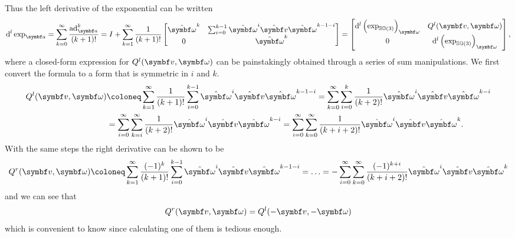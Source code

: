 Thus the left derivative of the exponential can be written
\begin{equation*}
  \mathrm{d}^l \exp_\a = \sum_{k = 0}^\infty \frac{\ad_\a^k}{(k+1)!} = I + \sum_{k = 1}^\infty \frac{1}{(k+1)!}  \begin{bmatrix}
    \hat \bomega^k & \sum_{i = 0}^{k-1} \hat \bomega^i \hat \bv \hat \bomega^{k - 1 - i} \\ 0 & \hat \bomega^k
  \end{bmatrix} = \begin{bmatrix}
    \mathrm{d}^l \left(\exp_{\SOthree}\right)_\bomega & Q^l(\bv, \bomega)                                 \\
    0                                                 & \mathrm{d}^l \left(\exp_{\SOthree}\right)_\bomega
  \end{bmatrix},
\end{equation*}
where a closed-form expression for $Q^l(\bv, \bomega)$ can be painstakingly obtained through a series of sum manipulations. We first convert the formula to a form that is symmetric in $i$ and $k$.
\begin{equation*}
  \begin{aligned}
    Q^l(\bv, \bomega) & \coloneq \sum_{k = 1}^\infty \frac{1}{(k+1)!} \sum_{i=0}^{k-1} \hat \bomega^i \hat \bv \hat \bomega^{k - 1 - i} = \sum_{k = 0}^\infty \sum_{i=0}^{k} \frac{1}{(k+2)!} \hat \bomega^i \hat \bv \hat \bomega^{k - i} \\
                      & = \sum_{i = 0}^\infty \sum_{k = i}^\infty \frac{1}{(k+2)!} \hat \bomega^i \hat \bv \hat \bomega^{k - i} = \sum_{i = 0}^\infty \sum_{k = 0}^\infty \frac{1}{(k+i+2)!} \hat \bomega^i \hat \bv \hat \bomega^{k}.
  \end{aligned}
\end{equation*}
With the same steps the right derivative can be shown to be
\begin{equation}
  \label{eq:se3_qr}
  Q^r(\bv, \bomega) \coloneq \sum_{k=1}^\infty \frac{(-1)^k}{(k+1)!} \sum_{i=0}^{k-1} \hat \bomega ^i \hat \bv \hat \bomega^{k-1-i} = \ldots = - \sum_{i = 0}^\infty \sum_{k = 0}^\infty \frac{(-1)^{k+i}}{(k+i+2)!} \hat \bomega^i \hat \bv \hat \bomega^{k}
\end{equation}
and we can see that
\begin{equation}
  Q^r(\bv, \bomega) = Q^l(-\bv, -\bomega)
\end{equation}
which is convenient to know since calculating one of them is tedious enough.

